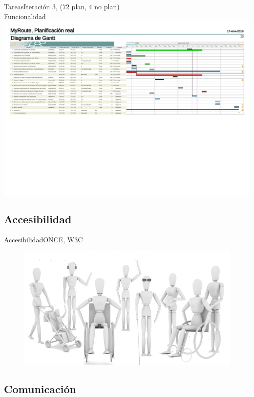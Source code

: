 \documentclass{beamer}
\begin{document}
\begin{frame}{Tareas}{Iteraci\'on 3, (72 plan, 4 no plan)\\
Funcionalidad}
\centering
\hspace{1cm}
\\[1cm]
\includegraphics[width=0.8\paperwidth]{images_latex/gantt_itr3}
\end{frame}

\subsection{Accesibilidad}
\begin{frame}{Accesibilidad}{ONCE, W3C}
  \begin{figure}
   \includegraphics[scale=0.3]{images_latex/accesibilidad}
  \end{figure}

\end{frame}


\subsection{Comunicaci\'on}
\end{document}
